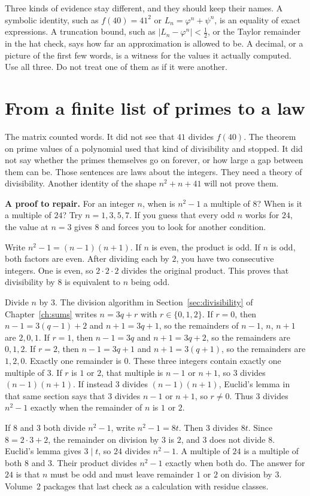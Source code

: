 Three kinds of evidence stay different, and they should keep their names. A symbolic identity, such as $f(40)=41^2$ or $L_n=\varphi^n+\psi^n$, is an equality of exact expressions. A truncation bound, such as $|L_n-\varphi^n|<\frac12$, or the Taylor remainder in the hat check, says how far an approximation is allowed to be. A decimal, or a picture of the first few words, is a witness for the values it actually computed. Use all three. Do not treat one of them as if it were another.

\section*{From a finite list of primes to a law}
The matrix counted words. It did not see that $41$ divides $f(40)$. The theorem on prime values of a polynomial used that kind of divisibility and stopped. It did not say whether the primes themselves go on forever, or how large a gap between them can be. Those sentences are laws about the integers. They need a theory of divisibility. Another identity of the shape $n^2+n+41$ will not prove them.

\textbf{A proof to repair.} For an integer $n$, when is $n^2-1$ a multiple of $8$? When is it a multiple of $24$? Try $n=1,3,5,7$. If you guess that every odd $n$ works for $24$, the value at $n=3$ gives $8$ and forces you to look for another condition.

Write $n^2-1=(n-1)(n+1)$. If $n$ is even, the product is odd. If $n$ is odd, both factors are even. After dividing each by $2$, you have two consecutive integers. One is even, so $2\cdot2\cdot2$ divides the original product. This proves that divisibility by $8$ is equivalent to $n$ being odd.

Divide $n$ by $3$. The division algorithm in Section~\ref{sec:divisibility} of Chapter~\ref{ch:sums} writes $n=3q+r$ with $r\in\{0,1,2\}$. If $r=0$, then $n-1=3(q-1)+2$ and $n+1=3q+1$, so the remainders of $n-1$, $n$, $n+1$ are $2,0,1$. If $r=1$, then $n-1=3q$ and $n+1=3q+2$, so the remainders are $0,1,2$. If $r=2$, then $n-1=3q+1$ and $n+1=3(q+1)$, so the remainders are $1,2,0$. Exactly one remainder is $0$. These three integers contain exactly one multiple of $3$. If $r$ is $1$ or $2$, that multiple is $n-1$ or $n+1$, so $3$ divides $(n-1)(n+1)$. If instead $3$ divides $(n-1)(n+1)$, Euclid's lemma in that same section says that $3$ divides $n-1$ or $n+1$, so $r\ne0$. Thus $3$ divides $n^2-1$ exactly when the remainder of $n$ is $1$ or $2$.

If $8$ and $3$ both divide $n^2-1$, write $n^2-1=8t$. Then $3$ divides $8t$. Since $8=2\cdot3+2$, the remainder on division by $3$ is $2$, and $3$ does not divide $8$. Euclid's lemma gives $3\mid t$, so $24$ divides $n^2-1$. A multiple of $24$ is a multiple of both $8$ and $3$. Their product divides $n^2-1$ exactly when both do. The answer for $24$ is that $n$ must be odd and must leave remainder $1$ or $2$ on division by $3$. Volume~2 packages that last check as a calculation with residue classes.

